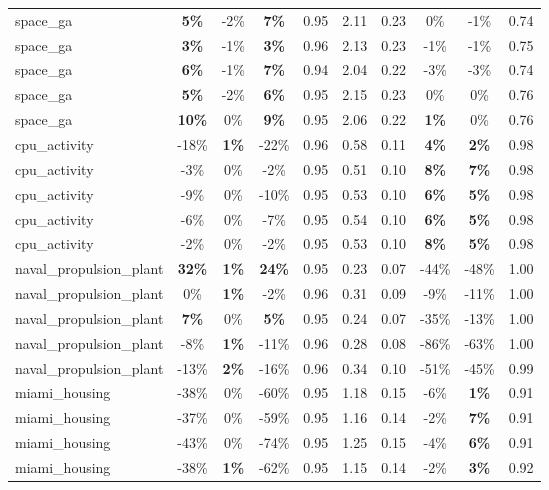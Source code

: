 \begin{table}[!htbp]
\begin{small}
\begin{sc}
{\begin{tabular}{lccccccccc}
space\_ga & \textbf{5\%} & -2\% & \textbf{7\%} & 0.95 & 2.11 & 0.23 & 0\% & -1\% & 0.74 \\
space\_ga & \textbf{3\%} & -1\% & \textbf{3\%} & 0.96 & 2.13 & 0.23 & -1\% & -1\% & 0.75 \\
space\_ga & \textbf{6\%} & -1\% & \textbf{7\%} & 0.94 & 2.04 & 0.22 & -3\% & -3\% & 0.74 \\
space\_ga & \textbf{5\%} & -2\% & \textbf{6\%} & 0.95 & 2.15 & 0.23 & 0\% & 0\% & 0.76 \\
space\_ga & \textbf{10\%} & 0\% & \textbf{9\%} & 0.95 & 2.06 & 0.22 & \textbf{1\%} & 0\% & 0.76 \\
cpu\_activity & -18\% & \textbf{1\%} & -22\% & 0.96 & 0.58 & 0.11 & \textbf{4\%} & \textbf{2\%} & 0.98 \\
cpu\_activity & -3\% & 0\% & -2\% & 0.95 & 0.51 & 0.10 & \textbf{8\%} & \textbf{7\%} & 0.98 \\
cpu\_activity & -9\% & 0\% & -10\% & 0.95 & 0.53 & 0.10 & \textbf{6\%} & \textbf{5\%} & 0.98 \\
cpu\_activity & -6\% & 0\% & -7\% & 0.95 & 0.54 & 0.10 & \textbf{6\%} & \textbf{5\%} & 0.98 \\
cpu\_activity & -2\% & 0\% & -2\% & 0.95 & 0.53 & 0.10 & \textbf{8\%} & \textbf{5\%} & 0.98 \\
naval\_propulsion\_plant & \textbf{32\%} & \textbf{1\%} & \textbf{24\%} & 0.95 & 0.23 & 0.07 & -44\% & -48\% & 1.00 \\
naval\_propulsion\_plant & 0\% & \textbf{1\%} & -2\% & 0.96 & 0.31 & 0.09 & -9\% & -11\% & 1.00 \\
naval\_propulsion\_plant & \textbf{7\%} & 0\% & \textbf{5\%} & 0.95 & 0.24 & 0.07 & -35\% & -13\% & 1.00 \\
naval\_propulsion\_plant & -8\% & \textbf{1\%} & -11\% & 0.96 & 0.28 & 0.08 & -86\% & -63\% & 1.00 \\
naval\_propulsion\_plant & -13\% & \textbf{2\%} & -16\% & 0.96 & 0.34 & 0.10 & -51\% & -45\% & 0.99 \\
miami\_housing & -38\% & 0\% & -60\% & 0.95 & 1.18 & 0.15 & -6\% & \textbf{1\%} & 0.91 \\
miami\_housing & -37\% & 0\% & -59\% & 0.95 & 1.16 & 0.14 & -2\% & \textbf{7\%} & 0.91 \\
miami\_housing & -43\% & 0\% & -74\% & 0.95 & 1.25 & 0.15 & -4\% & \textbf{6\%} & 0.91 \\
miami\_housing & -38\% & \textbf{1\%} & -62\% & 0.95 & 1.15 & 0.14 & -2\% & \textbf{3\%} & 0.92 \\

\end{tabular}}
\end{sc}
\end{small}
\end{table}
